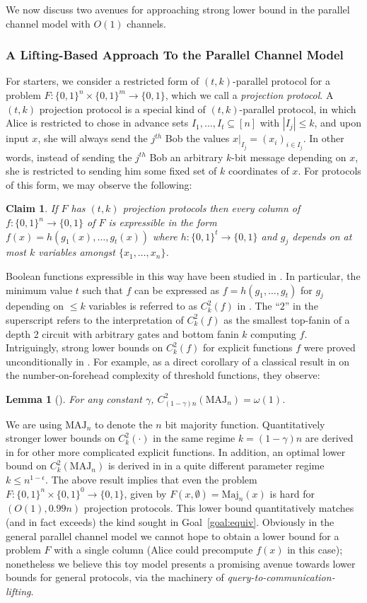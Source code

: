 \documentclass[11pt]{article}
\newtheorem*{lemma*}{Lemma}
\newtheorem{claim}{Claim}
\newcommand{\B}{\{0,1\}}
\begin{document}
We now discuss two avenues for approaching strong lower bound in the parallel channel model with $O(1)$ channels.
\subsubsection{A Lifting-Based Approach To the Parallel Channel Model}
For starters, we consider a restricted form of $(t,k)$-parallel protocol for a problem $F: \B^n \times \B^m \to \B$, which we call a \emph{projection protocol}. A $(t,k)$ projection protocol is a special kind of $(t,k)$-parallel protocol, in which Alice is restricted to chose in advance sets $I_1,\ldots,I_t \subseteq [n]$ with $|I_j| \leq k$, and upon input $x$, she will always send the $j^{th}$ Bob the values $x|_{I_j} =(x_i)_{i \in I_j}$. In other words, instead of sending the $j^{th}$ Bob an arbitrary $k$-bit message depending on $x$, she is restricted to sending him some fixed set of $k$ coordinates of $x$.
For protocols of this form, we may observe the following:
\begin{claim}
If $F$ has $(t,k)$ projection protocols then every column of $f: \B^n \to \B$ of $F$ is expressible in the form $f(x) = h(g_1(x),\ldots,g_t(x))$ where $h: \B^t \to \B$ and $g_j$ depends on at most $k$ variables amongst $\{x_1,\ldots,x_n\}$.
\end{claim}
Boolean functions expressible in this way have been studied in \cite{hrubes-rao,lecomte2022composition}. In particular, the minimum value $t$ such that $f$ can be expressed as $f = h(g_1,\ldots,g_t)$ for $g_j$ depending on $\leq k$ variables is referred to as $C^2_k(f)$ in \cite{hrubes-rao}. The ``$2$'' in the superscript refers to the interpretation of $C^2_k(f)$ as the smallest top-fanin of a depth 2 circuit with arbitrary gates and bottom fanin $k$ computing $f$. Intriguingly, strong lower bounds on $C^2_k(f)$ for explicit functions $f$ were proved unconditionally in \cite{hrubes-rao}. For example, as a direct corollary of a classical result in \cite{cfl} on the number-on-forehead complexity of threshold functions, they observe:
\begin{lemma*}[\cite{cfl,hrubes-rao}]
For any constant $\gamma$, $C^2_{(1-\gamma)n}(\mathrm{MAJ}_n) =\omega(1)$.
\end{lemma*}
We are using $\mathrm{MAJ}_n$ to denote the $n$ bit majority function. Quantitatively stronger lower bounds on $C^2_k(\cdot)$ in the same regime $k = (1-\gamma)n$ are derived in \cite{hrubes-rao} for other more complicated explicit functions. In addition, an optimal lower bound on $C^2_{k}(\mathrm{MAJ}_n)$ is derived in \cite{lecomte2022composition} in a quite different parameter regime $k \leq n^{1-\epsilon}$. The above result implies that even the problem $F: \B^n \times \B^0 \to \B$, given by $F(x,\emptyset) = \mathrm{Maj}_n(x)$ is hard for $(O(1),0.99n)$ projection protocols. This lower bound quantitatively matches (and in fact exceeds) the kind sought in Goal~\ref{goal:equiv}. Obviously in the general parallel channel model we cannot hope to obtain a lower bound for a problem $F$ with a single column (Alice could precompute $f(x)$ in this case); nonetheless we believe this toy model presents a promising avenue towards lower bounds for general protocols, via the machinery of \emph{query-to-communication-lifting}.
\end{document}
